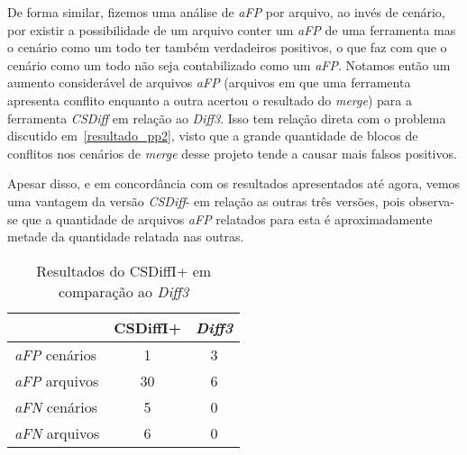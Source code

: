 De forma similar, fizemos uma análise de \emph{aFP} por arquivo, ao invés de
cenário, por existir a possibilidade de um arquivo conter um \emph{aFP} de uma
ferramenta mas o cenário como um todo ter também verdadeiros positivos, o que
faz com que o cenário como um todo não seja contabilizado como um \emph{aFP}.
Notamos então um aumento considerável de arquivos \emph{aFP} (arquivos em que
uma ferramenta apresenta conflito enquanto a outra acertou o resultado do
\emph{merge}) para a ferramenta \emph{CSDiff} em relação ao \emph{Diff3}. Isso
tem relação direta com o problema discutido em~\ref{resultado_pp2}, visto que a
grande quantidade de blocos de conflitos nos cenários de \emph{merge} desse
projeto tende a causar mais falsos positivos.

Apesar disso, e em concordância com os resultados apresentados até agora, vemos
uma vantagem da versão \emph{CSDiff}- em relação as outras três versões, pois
observa-se que a quantidade de arquivos \emph{aFP} relatados para esta é
aproximadamente metade da quantidade relatada nas outras.

\begin{table}[ht]
	\begin{center}
		\begin{tabular}{|l|c|c|}
			\hline
			\textbf{ }          & \textbf{CSDiffI+} & \textbf{\emph{Diff3}} \\
			\hline
			\emph{aFP} cenários & 1                 & 3                     \\
			\emph{aFP} arquivos & 30                & 6                     \\
			\emph{aFN} cenários & 5                 & 0                     \\
			\emph{aFN} arquivos & 6                 & 0                     \\
			\hline
		\end{tabular}
	\end{center}
	\caption{Resultados do CSDiffI+ em comparação ao \emph{Diff3}}\label{csdiff_indentation_plus_afp_afn}
\end{table}

